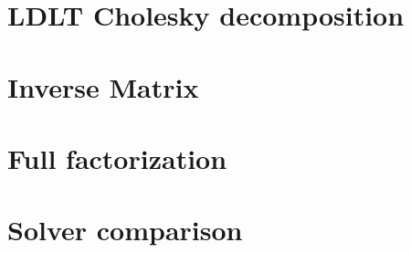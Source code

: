 \documentclass[fontsize = 10pt,DIV = 13]{scrartcl}
\begin{document}
\begin{comment}


\subsection{Notation}

This document uses bold symbols for matrices and vectors.
Bold capital letters like $\mathbf{A}$ are used for matrices.
Lower case bold letters are used for vectors ($\mathbf{r}$, $\mathbf{x}$).
The individual elements of a vector are given by:

\begin{align*}
\mathbf{x}
=
\begin{bmatrix}
x_0\\
x_1\\
\vdots\\
x_{N-1}
\end{bmatrix}
\end{align*}

Zero based indexing is used since this makes it easier to translate the equations into C++ code.


The individual components of the matrix $\mathbf{A}$ can be distinguished by a single column specific character and a zero based row index.
The column specific characters start with the character $a$ for the first column and increase alphabetically.
For example, the components of $\mathbf{A}$ with size $3 \times 3$ are:

\begin{align*}
\mathbf{A}
=
\begin{bmatrix}
a_0&b_0&c_0\\
a_1&b_1&c_1\\
a_2&b_2&c_2
\end{bmatrix}
\end{align*}

This element naming is chosen because it can be easier translated into vectorized code than the common double index notation.
\end{comment}








\section{LDLT Cholesky decomposition}
\label{sec:LDL}

\section{Inverse Matrix}
\label{sec:InverseMatrix}

\section{Full factorization}
\label{sec:fullFactorization}




\section{Solver comparison}
\label{sec:solverSelection}
\end{document}
